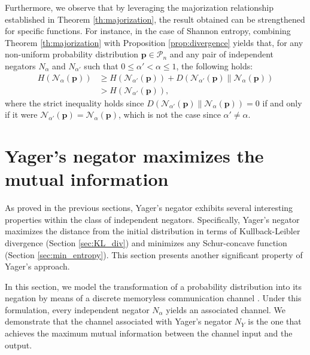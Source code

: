 \documentclass[pdflatex,sn-basic,iicol]{sn-jnl}%
\theoremstyle{thmstyleone}%
\theoremstyle{thmstyletwo}%
\theoremstyle{thmstylethree}%
\newcommand{\N}{\mathcal{N}}
\newcommand{\cP}{\mathcal{P}}
\newcommand{\bp}{\mathbf{p}}
\begin{document}
Furthermore, we observe that by leveraging the majorization relationship established in Theorem \ref{th:majorization}, the result obtained can be strengthened for specific functions. For instance, in the case of Shannon entropy, combining Theorem \ref{th:majorization} with Proposition \ref{prop:divergence} yields that, for any non-uniform probability distribution $\bp\in\cP_n$ and any pair of independent negators $N_\alpha$ and $N_{\alpha'}$ such that $0 \le \alpha' < \alpha \le 1$, the following holds:
\begin{align*}
    H(\N_\alpha(\bp)) &\ge H(\N_{\alpha'}(\bp)) + D(\N_{\alpha'}(\bp) \| \N_\alpha(\bp))\\ &> H(\N_{\alpha'}(\bp)),
\end{align*}
where the strict inequality holds since $D(\N_{\alpha'}(\bp) \| \N_\alpha(\bp))=0$ if and only if 
it were $\N_{\alpha'}(\bp)=\N_{\alpha}(\bp)$, which is not the case since $\alpha'\neq \alpha$.



\section{Yager's negator maximizes the mutual  information}\label{sec:maximal_mutual_information}

As proved in the previous sections, Yager's negator exhibits several interesting properties within the class of independent negators. Specifically, Yager's negator maximizes the distance from the initial distribution in terms of Kullback-Leibler divergence (Section \ref{sec:KL_div}) and minimizes any Schur-concave function (Section \ref{sec:min_entropy}). This section presents another significant property of Yager's approach.

In this section, we model the  transformation of a probability distribution into
its negation by means of 
a discrete memoryless communication channel \cite[Ch. 7]{CT}.
Under this formulation, every independent negator $N_\alpha$ yields an associated channel. We demonstrate that the channel associated with Yager's negator $N_Y$ is the one that achieves the maximum mutual information
between the channel input and the output. 
\end{document}
